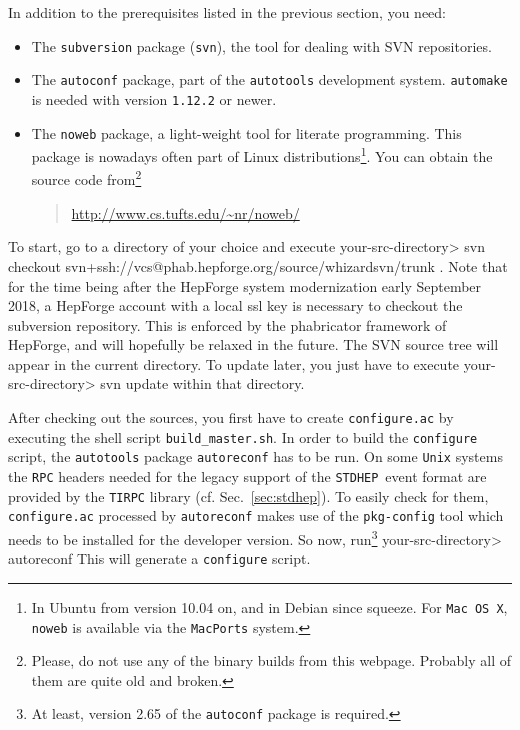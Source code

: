 \documentclass[12pt]{book}
\newenvironment{interaction}%
  {\begingroup\small
   \Verbatim}%
  {\endVerbatim
   \endgroup\noindent}
\newcommand{\ttt}[1]{\texttt{#1}}
\newcommand{\stdhep}{\ttt{STDHEP}}
\begin{document}
In addition to the prerequisites listed in the previous section, you
need:
\begin{itemize}
\item
  The \ttt{subversion} package (\ttt{svn}), the tool for dealing with
  SVN repositories.
\item
  The \ttt{autoconf} package, part of the \ttt{autotools} development
  system. \ttt{automake} is needed with version \ttt{1.12.2} or newer.
\item
  The \ttt{noweb} package, a light-weight tool for literate programming.  This
  package is nowadays often part of Linux distributions\footnote{In
    Ubuntu from version 10.04 on, and in Debian since
    squeeze. For \ttt{Mac OS X}, \ttt{noweb} is available via the
    \ttt{MacPorts} system.}.  You can obtain the source code
  from\footnote{Please, do not use any of the binary builds from this
    webpage. Probably all of them are quite old and broken.}
  \begin{quote}
    \url{http://www.cs.tufts.edu/~nr/noweb/}
  \end{quote}
\end{itemize}
To start, go to a directory of your choice and execute
\begin{interaction}
  your-src-directory> svn checkout
  svn+ssh://vcs@phab.hepforge.org/source/whizardsvn/trunk \;\; .
\end{interaction}
Note that for the time being after the HepForge system modernization
early September 2018, a HepForge account with a local ssl key is
necessary to checkout the subversion repository. This is enforced by
the phabricator framework of HepForge, and will hopefully be relaxed
in the future. The SVN source tree will appear in the current
directory.  To update later, you just have to execute
\begin{interaction}
  your-src-directory> svn update
\end{interaction}
within that directory.

After checking out the sources, you first have to create
\ttt{configure.ac} by executing the shell script
\ttt{build\_master.sh}. In order to build the \ttt{configure}
script, the \ttt{autotools} package \ttt{autoreconf} has to be run. On
some \ttt{Unix} systems the \ttt{RPC} headers needed for the legacy
support of the \stdhep\ event format are provided by the \ttt{TIRPC}
library (cf. Sec.~\ref{sec:stdhep}). To easily check for them,
\ttt{configure.ac} processed by \ttt{autoreconf} makes use of the
\ttt{pkg-config} tool which needs to be installed for the developer
version. So now, run\footnote{At least, version
  2.65 of the \ttt{autoconf} package is required.}
\begin{interaction}
  your-src-directory> autoreconf
\end{interaction}
This will generate a \ttt{configure} script.
\end{document}
